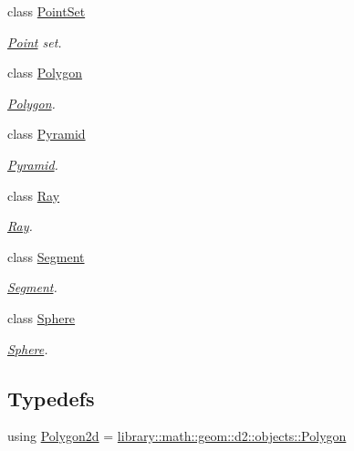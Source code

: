 \begin{DoxyCompactItemize}
class \hyperlink{classlibrary_1_1math_1_1geom_1_1d3_1_1objects_1_1_point_set}{Point\+Set}
\begin{DoxyCompactList}\small\item\em \hyperlink{classlibrary_1_1math_1_1geom_1_1d3_1_1objects_1_1_point}{Point} set. \end{DoxyCompactList}\item 
class \hyperlink{classlibrary_1_1math_1_1geom_1_1d3_1_1objects_1_1_polygon}{Polygon}
\begin{DoxyCompactList}\small\item\em \hyperlink{classlibrary_1_1math_1_1geom_1_1d3_1_1objects_1_1_polygon}{Polygon}. \end{DoxyCompactList}\item 
class \hyperlink{classlibrary_1_1math_1_1geom_1_1d3_1_1objects_1_1_pyramid}{Pyramid}
\begin{DoxyCompactList}\small\item\em \hyperlink{classlibrary_1_1math_1_1geom_1_1d3_1_1objects_1_1_pyramid}{Pyramid}. \end{DoxyCompactList}\item 
class \hyperlink{classlibrary_1_1math_1_1geom_1_1d3_1_1objects_1_1_ray}{Ray}
\begin{DoxyCompactList}\small\item\em \hyperlink{classlibrary_1_1math_1_1geom_1_1d3_1_1objects_1_1_ray}{Ray}. \end{DoxyCompactList}\item 
class \hyperlink{classlibrary_1_1math_1_1geom_1_1d3_1_1objects_1_1_segment}{Segment}
\begin{DoxyCompactList}\small\item\em \hyperlink{classlibrary_1_1math_1_1geom_1_1d3_1_1objects_1_1_segment}{Segment}. \end{DoxyCompactList}\item 
class \hyperlink{classlibrary_1_1math_1_1geom_1_1d3_1_1objects_1_1_sphere}{Sphere}
\begin{DoxyCompactList}\small\item\em \hyperlink{classlibrary_1_1math_1_1geom_1_1d3_1_1objects_1_1_sphere}{Sphere}. \end{DoxyCompactList}\end{DoxyCompactItemize}
\subsection*{Typedefs}
\begin{DoxyCompactItemize}
\item 
using \hyperlink{namespacelibrary_1_1math_1_1geom_1_1d3_1_1objects_ae339035ccf9a6f4f0d2945fdcfd76f95}{Polygon2d} = \hyperlink{classlibrary_1_1math_1_1geom_1_1d2_1_1objects_1_1_polygon}{library\+::math\+::geom\+::d2\+::objects\+::\+Polygon}
\end{DoxyCompactItemize}
